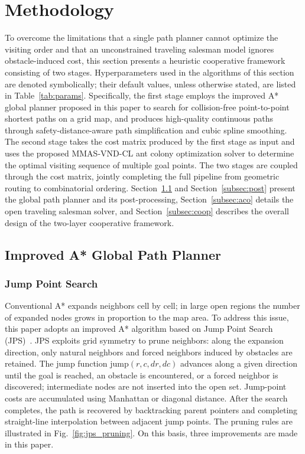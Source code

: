 \section{Methodology}
\label{sec:method}

To overcome the limitations that a single path planner cannot optimize the visiting order and that an unconstrained traveling salesman model ignores obstacle-induced cost, this section presents a heuristic cooperative framework consisting of two stages. Hyperparameters used in the algorithms of this section are denoted symbolically; their default values, unless otherwise stated, are listed in Table~\textcolor{blue}{\ref{tab:params}}. Specifically, the first stage employs the improved A* global planner proposed in this paper to search for collision-free point-to-point shortest paths on a grid map, and produces high-quality continuous paths through safety-distance-aware path simplification and cubic spline smoothing. The second stage takes the cost matrix produced by the first stage as input and uses the proposed MMAS-VND-CL ant colony optimization solver to determine the optimal visiting sequence of multiple goal points. The two stages are coupled through the cost matrix, jointly completing the full pipeline from geometric routing to combinatorial ordering. Section~\textcolor{blue}{\ref{subsec:jps}} and Section~\textcolor{blue}{\ref{subsec:post}} present the global path planner and its post-processing, Section~\textcolor{blue}{\ref{subsec:aco}} details the open traveling salesman solver, and Section~\textcolor{blue}{\ref{subsec:coop}} describes the overall design of the two-layer cooperative framework.

\subsection{Improved A* Global Path Planner}
\label{subsec:jps}

\subsubsection{Jump Point Search}

Conventional A* expands neighbors cell by cell; in large open regions the number of expanded nodes grows in proportion to the map area. To address this issue, this paper adopts an improved A* algorithm based on Jump Point Search (JPS)~\textcolor{blue}{\cite{ref11,ref12}}. JPS exploits grid symmetry to prune neighbors: along the expansion direction, only natural neighbors and forced neighbors induced by obstacles are retained. The jump function $\mathrm{jump}(r, c, dr, dc)$ advances along a given direction until the goal is reached, an obstacle is encountered, or a forced neighbor is discovered; intermediate nodes are not inserted into the open set. Jump-point costs are accumulated using Manhattan or diagonal distance. After the search completes, the path is recovered by backtracking parent pointers and completing straight-line interpolation between adjacent jump points. The pruning rules are illustrated in Fig.~\textcolor{blue}{\ref{fig:jps_pruning}}. On this basis, three improvements are made in this paper.

